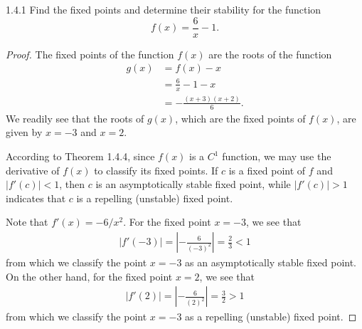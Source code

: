 \begin{problem}{1.4.1}
  Find the fixed points and determine their stability for the function $$f(x) = \frac{6}{x} - 1.$$
\end{problem}

\begin{proof}
  The fixed points of the function $f(x)$ are the roots of the function
  \begin{align*}
    g(x)
    &= f(x) - x \\
    &= \frac{6}{x} - 1 - x \\
    &= -\frac{(x+3)(x+2)}{6}.
  \end{align*}
  We readily see that the roots of $g(x)$, which are the fixed points of $f(x)$,
  are given by $x=-3$ and $x=2$.

  According to Theorem 1.4.4, since $f(x)$ is a $C^1$ function, we may use the derivative
  of $f(x)$ to classify its fixed points. If $c$ is a fixed point of $f$ and
  $\left|f'(c)\right| < 1$, then $c$ is an asymptotically stable fixed point, while $\left|f'(c)\right| > 1$
  indicates that $c$ is a repelling (unstable) fixed point.

  Note that $f'(x) = -6/x^2.$ For the fixed point $x=-3$, we see that
  \begin{align*}
    \left|f'(-3)\right| = \left|- \frac{6}{(-3)^2}\right| = \frac{2}{3} < 1
  \end{align*}
  from which we classify the point $x=-3$ as an asymptotically stable fixed point.
  On the other hand, for the fixed point $x=2$, we see that
  \begin{align*}
    \left|f'(2)\right| = \left|- \frac{6}{(2)^2}\right| = \frac{3}{2} > 1
  \end{align*}
  from which we classify the point $x=-3$ as a repelling (unstable) fixed point.
\end{proof}
\newpage
